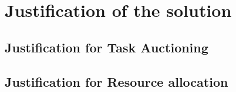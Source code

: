 \chapter{Justification of the solution}\label{ch:justification-of-the-solution}
\section{Justification for Task Auctioning}\label{sec:justification-for-task-auctioning}

\section{Justification for Resource allocation}\label{sec:justification-for-resource-allocation}